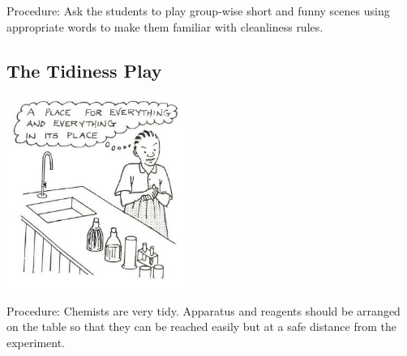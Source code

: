 \begin{multicols}{2}
\begin{description*}
\item[Procedure:]{Ask the students to play group-wise short
and funny scenes using appropriate words to
make them familiar with cleanliness rules.}
\end{description*}

\subsection{The Tidiness Play}

\begin{center}
\includegraphics[width=0.45\textwidth]{./img/source/tidiness-play.jpg}
\end{center}

\begin{description*}
\item[Procedure:]{Chemists are very tidy. Apparatus and
reagents should be arranged on the table so that
they can be reached easily but at a safe distance
from the experiment.}
\end{description*}

\end{multicols}

